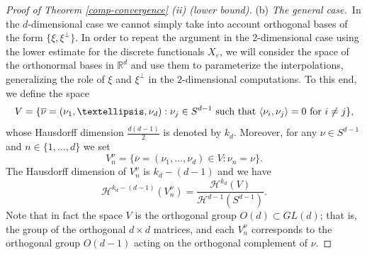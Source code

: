 \documentclass[10pt,a4paper]{amsart}
\def\e{\varepsilon}
\begin{document}
\begin{proof}[Proof of Theorem {\rm\ref{comp-convergence}} {\rm (ii)} (lower bound)]
\smallskip 

\noindent(b) {\em The general case.}\ 
In the $d$-dimensional case we cannot simply take into account orthogonal bases of the form $\{\xi, \xi^\perp\}$. 
In order to repeat the argument in the $2$-dimensional case using the lower estimate for the discrete functionals $X_\e$, we will consider the space of the orthonormal bases in $\mathbb R^d$ 
and use them to parameterize the interpolations, generalizing the role of $\xi$ and $\xi^\perp$ in the $2$-dimensional computations.  
To this end, we define the space
$$V=\{\overline \nu=(\nu_1,\dots, \nu_d): \nu_j\in S^{d-1}  \ \hbox{\rm such that }  \langle \nu_i, \nu_j\rangle=0 \ \hbox{\rm for } i\neq j\},$$ 
whose Hausdorff dimension $\frac{d(d-1)}{2}$ is denoted by $k_d$. 
Moreover, for any $\nu\in S^{d-1}$ and $n\in \{1,\dots, d\}$ we set 
$$V^{\nu}_n=\{\overline \nu=(\nu_1,\dots, \nu_d)\in V: \nu_n=\nu\}.$$ 
The Hausdorff dimension of $V^{\nu}_n$ is $k_d-(d-1)$ and we have 
\begin{equation}\label{dim} 
\mathcal H^{k_d-(d-1)}(V^{\nu}_n)=\frac{\mathcal H^{k_d}(V)}{\mathcal H^{d-1}(S^{d-1})}.
\end{equation} 
Note that in fact the space $V$ is the orthogonal group $O(d)\subset GL(d)$; that is, the group of the orthogonal $d\times d$ matrices, and each $V^{\nu}_n$ corresponds to the orthogonal group $O(d-1)$ acting on the orthogonal complement of $\nu$. 


\end{proof}
\end{document}
